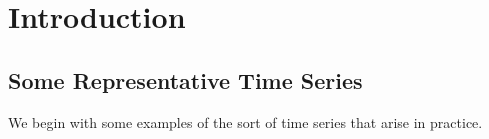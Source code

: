\section{Introduction}



\subsection{Some Representative Time Series}
We begin with some examples of the sort of time series that arise in practice.


